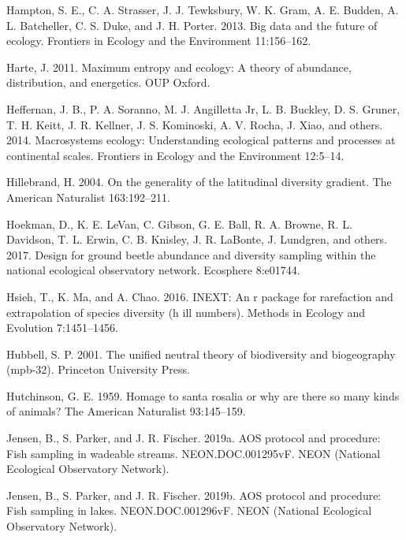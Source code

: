 \documentclass[
  12pt,
]{article}
\newlength{\cslhangindent}
\newenvironment{cslreferences}%
  {\setlength{\parindent}{0pt}%
  \everypar{\setlength{\hangindent}{\cslhangindent}}\ignorespaces}%
  {\par}
\begin{document}
\begin{cslreferences}
\leavevmode\hypertarget{ref-hampton2013big}{}%
Hampton, S. E., C. A. Strasser, J. J. Tewksbury, W. K. Gram, A. E. Budden, A. L. Batcheller, C. S. Duke, and J. H. Porter. 2013. Big data and the future of ecology. Frontiers in Ecology and the Environment 11:156--162.

\leavevmode\hypertarget{ref-harte2011maximum}{}%
Harte, J. 2011. Maximum entropy and ecology: A theory of abundance, distribution, and energetics. OUP Oxford.

\leavevmode\hypertarget{ref-heffernan2014macrosystems}{}%
Heffernan, J. B., P. A. Soranno, M. J. Angilletta Jr, L. B. Buckley, D. S. Gruner, T. H. Keitt, J. R. Kellner, J. S. Kominoski, A. V. Rocha, J. Xiao, and others. 2014. Macrosystems ecology: Understanding ecological patterns and processes at continental scales. Frontiers in Ecology and the Environment 12:5--14.

\leavevmode\hypertarget{ref-hillebrand2004generality}{}%
Hillebrand, H. 2004. On the generality of the latitudinal diversity gradient. The American Naturalist 163:192--211.

\leavevmode\hypertarget{ref-hoekman2017design}{}%
Hoekman, D., K. E. LeVan, C. Gibson, G. E. Ball, R. A. Browne, R. L. Davidson, T. L. Erwin, C. B. Knisley, J. R. LaBonte, J. Lundgren, and others. 2017. Design for ground beetle abundance and diversity sampling within the national ecological observatory network. Ecosphere 8:e01744.

\leavevmode\hypertarget{ref-hsieh2016inext}{}%
Hsieh, T., K. Ma, and A. Chao. 2016. INEXT: An r package for rarefaction and extrapolation of species diversity (h ill numbers). Methods in Ecology and Evolution 7:1451--1456.

\leavevmode\hypertarget{ref-hubbell2001unified}{}%
Hubbell, S. P. 2001. The unified neutral theory of biodiversity and biogeography (mpb-32). Princeton University Press.

\leavevmode\hypertarget{ref-hutchinson1959homage}{}%
Hutchinson, G. E. 1959. Homage to santa rosalia or why are there so many kinds of animals? The American Naturalist 93:145--159.

\leavevmode\hypertarget{ref-Jensen2019a}{}%
Jensen, B., S. Parker, and J. R. Fischer. 2019a. AOS protocol and procedure: Fish sampling in wadeable streams. NEON.DOC.001295vF. NEON (National Ecological Observatory Network).

\leavevmode\hypertarget{ref-Jensen2019b}{}%
Jensen, B., S. Parker, and J. R. Fischer. 2019b. AOS protocol and procedure: Fish sampling in lakes. NEON.DOC.001296vF. NEON (National Ecological Observatory Network).


\end{cslreferences}
\end{document}
